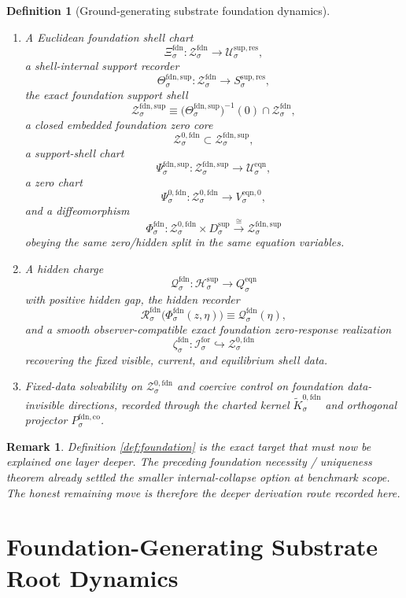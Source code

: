 \documentclass[11pt]{article}
\newcommand{\ForSpace}[1]{\mathcal I_{#1}^{\mathrm{for}}}
\newcommand{\FoundShellSet}[1]{\mathcal Z_{#1}^{\mathrm{fdn}}}
\newcommand{\FoundChart}[1]{\Xi_{#1}^{\mathrm{fdn}}}
\newcommand{\FoundSupport}[1]{\Theta_{#1}^{\mathrm{fdn,sup}}}
\newcommand{\FoundSupportShell}[1]{\mathcal Z_{#1}^{\mathrm{fdn,sup}}}
\newcommand{\FoundZeroCore}[1]{\mathcal Z_{#1}^{0,\mathrm{fdn}}}
\newcommand{\FoundEqChart}[1]{\Psi_{#1}^{\mathrm{fdn,sup}}}
\newcommand{\FoundZeroChart}[1]{\Psi_{#1}^{0,\mathrm{fdn}}}
\newcommand{\FoundSplit}[1]{\Phi_{#1}^{\mathrm{fdn}}}
\newcommand{\FoundCharge}[1]{\mathcal Q_{#1}^{\mathrm{fdn}}}
\newcommand{\FoundResidual}[1]{\mathcal R_{#1}^{\mathrm{fdn}}}
\newcommand{\FoundEmbed}[1]{\zeta_{#1}^{\mathrm{fdn}}}
\newcommand{\FoundKernelCh}[1]{\widetilde K_{#1}^{0,\mathrm{fdn}}}
\newcommand{\FoundStateComp}[1]{P_{#1}^{\mathrm{fdn,co}}}
\newcommand{\ResSpace}[1]{\mathcal U_{#1}^{\mathrm{sup,res}}}
\newcommand{\ResTarget}[1]{S_{#1}^{\mathrm{sup,res}}}
\newcommand{\SeedHidden}[1]{\mathcal H_{#1}^{\mathrm{sup}}}
\newcommand{\SeedHiddenBody}[1]{D_{#1}^{\mathrm{sup}}}
\newcommand{\EqnSpace}[1]{\mathcal U_{#1}^{\mathrm{eqn}}}
\newcommand{\EqnTarget}[1]{Q_{#1}^{\mathrm{eqn}}}
\newcommand{\EqnZero}[1]{V_{#1}^{\mathrm{eqn},0}}
\newtheorem{definition}{Definition}
\newtheorem{remark}{Remark}
\begin{document}
\begin{definition}[Ground-generating substrate foundation dynamics]
\begin{enumerate}
    \item A Euclidean foundation shell chart
    \[
    \FoundChart{\sigma}:\FoundShellSet{\sigma}\to\ResSpace{\sigma},
    \]
    a shell-internal support recorder
    \[
    \FoundSupport{\sigma}:\FoundShellSet{\sigma}\to\ResTarget{\sigma},
    \]
    the exact foundation support shell
    \[
    \FoundSupportShell{\sigma}
    \equiv
    \bigl(\FoundSupport{\sigma}\bigr)^{-1}(0)\cap\FoundShellSet{\sigma},
    \]
    a closed embedded foundation zero core
    \[
    \FoundZeroCore{\sigma}\subset\FoundSupportShell{\sigma},
    \]
    a support-shell chart
    \[
    \FoundEqChart{\sigma}:\FoundSupportShell{\sigma}\to\EqnSpace{\sigma},
    \]
    a zero chart
    \[
    \FoundZeroChart{\sigma}:\FoundZeroCore{\sigma}\to\EqnZero{\sigma},
    \]
    and a diffeomorphism
    \[
    \FoundSplit{\sigma}:
    \FoundZeroCore{\sigma}\times\SeedHiddenBody{\sigma}
    \xrightarrow{\cong}
    \FoundSupportShell{\sigma}
    \]
    obeying the same zero/hidden split in the same equation variables.
    \item A hidden charge
    \[
    \FoundCharge{\sigma}:\SeedHidden{\sigma}\to\EqnTarget{\sigma}
    \]
    with positive hidden gap, the hidden recorder
    \[
    \FoundResidual{\sigma}\bigl(\FoundSplit{\sigma}(z,\eta)\bigr)
    \equiv
    \FoundCharge{\sigma}(\eta),
    \]
    and a smooth observer-compatible exact foundation zero-response realization
    \[
    \FoundEmbed{\sigma}:\ForSpace{\sigma}\hookrightarrow\FoundZeroCore{\sigma}
    \]
    recovering the fixed visible, current, and equilibrium shell data.
    \item Fixed-data solvability on \(\FoundZeroCore{\sigma}\) and coercive control on foundation data-invisible directions, recorded through the charted kernel \(\FoundKernelCh{\sigma}\) and orthogonal projector \(\FoundStateComp{\sigma}\).
\end{enumerate}
\end{definition}

\begin{remark}
Definition \ref{def:foundation} is the exact target that must now be explained one layer deeper. The preceding foundation necessity / uniqueness theorem already settled the smaller internal-collapse option at benchmark scope. The honest remaining move is therefore the deeper derivation route recorded here.
\end{remark}

\section{Foundation-Generating Substrate Root Dynamics}
\end{document}
